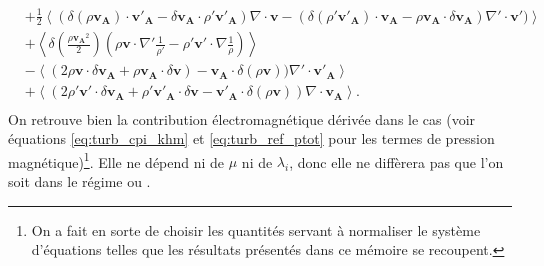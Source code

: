 \begin{equation}
\begin{array}{rl}
    &+  \frac{1}{2}\left< (\delta( \rho\boldsymbol{v_A}) \cdot \boldsymbol{v'_{A}}-\delta \boldsymbol{v_A} \cdot \rho'\boldsymbol{v'_{A}} )  \nabla \cdot \boldsymbol{v}-  (\delta (\rho' \boldsymbol{v'_A}) \cdot \boldsymbol{v_{A}}- \rho\boldsymbol{v_A} \cdot \delta \boldsymbol{v_{A}}) \nabla' \cdot \boldsymbol{v'})\right> \\%
    &+\left< \delta (\frac{\rho \boldsymbol{v_A}^2 }{2})( \rho \boldsymbol{v} \cdot \nabla'\frac{1}{\rho'}- \rho'  \boldsymbol{v'}\cdot \nabla \frac{1}{\rho}) \right> \\%
  &-\left<(2\rho \boldsymbol{v}\cdot \delta \boldsymbol{v_A}+ \rho\boldsymbol{v_A}\cdot \delta \boldsymbol{v})-\boldsymbol{v_A}\cdot \delta (\rho\boldsymbol{v}))  \nabla' \cdot \boldsymbol{v'_A} \right>\\%
&+ \left<(2\rho' \boldsymbol{v'} \cdot  \delta \boldsymbol{v_A} +\rho' \boldsymbol{v'_A} \cdot \delta \boldsymbol{v} -  \boldsymbol{v'_A} \cdot \delta (\rho\boldsymbol{v})) \nabla\cdot \boldsymbol{v_A}  \right>. \\%
\end{array}\end{equation}
On retrouve bien la contribution électromagnétique dérivée dans le cas  (voir équations \eqref{eq:turb_cpi_khm} et \eqref{eq:turb_ref_ptot} pour les termes de pression magnétique)\footnote{On a fait en sorte de choisir les quantités servant à normaliser le système d'équations telles que les résultats présentés dans ce mémoire se recoupent.\label{fn:warning}}. Elle ne dépend ni de $\mu$ ni de $\lambda_i$, donc elle ne diffèrera pas que l'on soit dans le régime  ou . 
